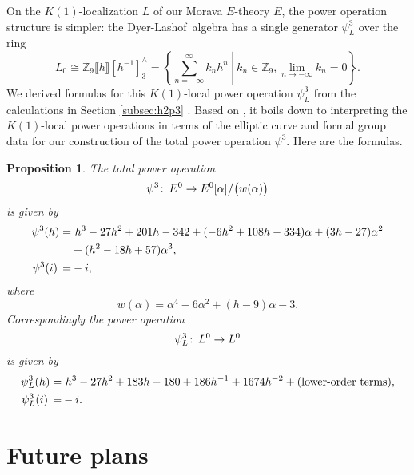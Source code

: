 \documentclass{rs}
\newtheorem{prop}[thm]{Proposition}
\theoremstyle{definition}
\theoremstyle{remark}
\def\co{\colon\thinspace}
\newcommand{\mb}[1]{\mathbb{#1}}
\newcommand{\DL}{Dyer-Lashof~}
\newcommand{\BZ}{{\mb Z}}
\newcommand{\A}{\alpha}
\newcommand{\p}{\psi^3}
\begin{document}
On the $K(1)$-localization $L$ of our Morava $E$-theory $E$, 
the power operation structure is simpler: 
the \DL algebra has a single generator $\p_L$ over the ring 
\[
 L_0 \cong \BZ_9 \llbracket h \rrbracket [h^{-1}]_3^\wedge = \left.\left\{\sum_{n = -\infty}^{\infty} k_n h^n~\right|~k_n \in \BZ_9, \lim_{n \to -\infty} k_n = 0\right\}.  
\]
We derived formulas for this $K(1)$-local power operation $\p_L$ 
from the calculations in Section \ref{subsec:h2p3} \cite[Section 4]{p3}.  
Based on \cite[Sections 2.4 and 8.2]{level3}, 
it boils down to interpreting the $K(1)$-local power operations 
in terms of the elliptic curve and formal group data 
for our construction of the total power operation $\p$.  
Here are the formulas.  

\begin{prop}
\label{prop}
 The total power operation 
 \[
  \p \co E^0 \to E^0 [\A] \big/ \big( w(\A) \big) 
 \]
 is given by 
 \begin{equation*}
 \begin{split}
  \p(h) = & ~ h^3 - 27 h^2 + 201 h -342 + (-6 h^2 + 108 h - 334) \A + (3 h - 27) \A^2 \\
          & + (h^2 - 18 h + 57) \A^3, \\
  \p(i) \thinspace = & -i, 
 \end{split}
 \end{equation*}
 where 
 \begin{equation}
 \label{w}
  w(\A) = \A^4 - 6 \A^2 + (h - 9) \A - 3.  
 \end{equation}
 Correspondingly the power operation 
 \[
  \p_L \co L^0 \to L^0 
 \]
 is given by 
 \begin{equation*}
 \begin{split}
  \psi_L^3(h) = & ~ h^3 - 27 h^2 + 183 h - 180 + 186 h^{-1} + 1674 h^{-2} + (\text{lower-order terms}), \\
  \psi_L^3(i) \thinspace = & -i.  
 \end{split}
 \end{equation*}
\end{prop}


\section{Future plans}
\label{sec:plans}
\end{document}
